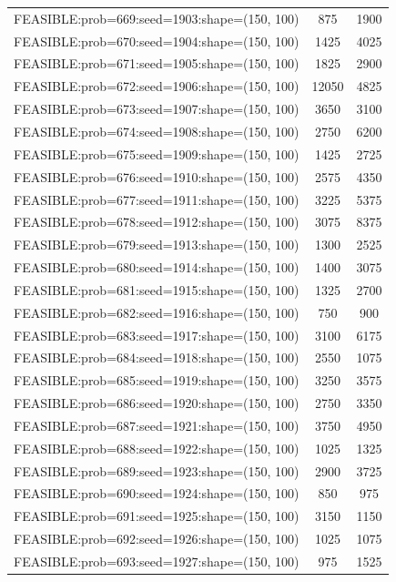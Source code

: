 \begin{longtable}{lcc}
FEASIBLE:prob=669:seed=1903:shape=(150, 100) &      875 &  1900 \\
FEASIBLE:prob=670:seed=1904:shape=(150, 100) &     1425 &  4025 \\
FEASIBLE:prob=671:seed=1905:shape=(150, 100) &     1825 &  2900 \\
FEASIBLE:prob=672:seed=1906:shape=(150, 100) &    12050 &  4825 \\
FEASIBLE:prob=673:seed=1907:shape=(150, 100) &     3650 &  3100 \\
FEASIBLE:prob=674:seed=1908:shape=(150, 100) &     2750 &  6200 \\
FEASIBLE:prob=675:seed=1909:shape=(150, 100) &     1425 &  2725 \\
FEASIBLE:prob=676:seed=1910:shape=(150, 100) &     2575 &  4350 \\
FEASIBLE:prob=677:seed=1911:shape=(150, 100) &     3225 &  5375 \\
FEASIBLE:prob=678:seed=1912:shape=(150, 100) &     3075 &  8375 \\
FEASIBLE:prob=679:seed=1913:shape=(150, 100) &     1300 &  2525 \\
FEASIBLE:prob=680:seed=1914:shape=(150, 100) &     1400 &  3075 \\
FEASIBLE:prob=681:seed=1915:shape=(150, 100) &     1325 &  2700 \\
FEASIBLE:prob=682:seed=1916:shape=(150, 100) &      750 &   900 \\
FEASIBLE:prob=683:seed=1917:shape=(150, 100) &     3100 &  6175 \\
FEASIBLE:prob=684:seed=1918:shape=(150, 100) &     2550 &  1075 \\
FEASIBLE:prob=685:seed=1919:shape=(150, 100) &     3250 &  3575 \\
FEASIBLE:prob=686:seed=1920:shape=(150, 100) &     2750 &  3350 \\
FEASIBLE:prob=687:seed=1921:shape=(150, 100) &     3750 &  4950 \\
FEASIBLE:prob=688:seed=1922:shape=(150, 100) &     1025 &  1325 \\
FEASIBLE:prob=689:seed=1923:shape=(150, 100) &     2900 &  3725 \\
FEASIBLE:prob=690:seed=1924:shape=(150, 100) &      850 &   975 \\
FEASIBLE:prob=691:seed=1925:shape=(150, 100) &     3150 &  1150 \\
FEASIBLE:prob=692:seed=1926:shape=(150, 100) &     1025 &  1075 \\
FEASIBLE:prob=693:seed=1927:shape=(150, 100) &      975 &  1525 \\

\end{longtable}

